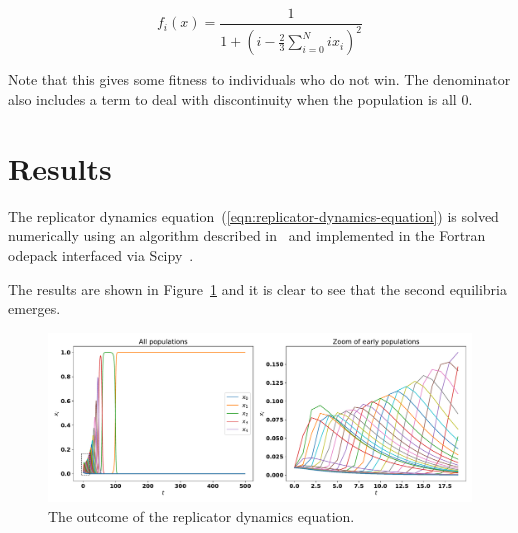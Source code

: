 \documentclass[a4paper]{article}
\begin{document}
\begin{equation}
    f_i(x) = \frac{1}{1 + \left(i - \frac{2}{3}\sum_{i=0}^{N}ix_i\right) ^ 2}
\end{equation}

Note that this gives some fitness to individuals who do not win. The denominator
also includes a term to deal with discontinuity when the population is all
\(0\).

\section{Results}

The replicator dynamics equation~(\ref{eqn:replicator-dynamics-equation}) is
solved numerically using an algorithm described in~\cite{lind1983} and
implemented in the Fortran odepack interfaced via Scipy~\cite{scipy2020}.

The results are shown in Figure~\ref{fig:replicatory-dynamics} and it is clear
to see that the second equilibria emerges.

\begin{figure}[!hbtp]
    \centering
    \includegraphics[width=.7\textwidth]{../static/evolution.pdf}
    \caption{The outcome of the replicator dynamics equation.}
    \label{fig:replicatory-dynamics}
\end{figure}



\end{document}
